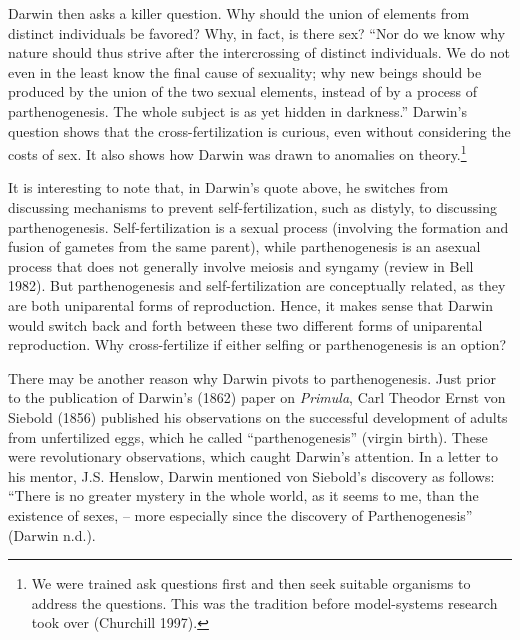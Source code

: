 \documentclass[
  letterpaper,
]{book}
\begin{document}
Darwin then asks a killer question. Why should the union of elements
from distinct individuals be favored? Why, in fact, is there sex? ``Nor
do we know why nature should thus strive after the intercrossing of
distinct individuals. We do not even in the least know the final cause
of sexuality; why new beings should be produced by the union of the two
sexual elements, instead of by a process of parthenogenesis. The whole
subject is as yet hidden in darkness.'' Darwin's question shows that the
cross-fertilization is curious, even without considering the costs of
sex. It also shows how Darwin was drawn to anomalies on
theory.\footnote{We were trained ask questions first and then seek
  suitable organisms to address the questions. This was the tradition
  before model-systems research took over (Churchill 1997).}

It is interesting to note that, in Darwin's quote above, he switches
from discussing mechanisms to prevent self-fertilization, such as
distyly, to discussing parthenogenesis. Self-fertilization is a sexual
process (involving the formation and fusion of gametes from the same
parent), while parthenogenesis is an asexual process that does not
generally involve meiosis and syngamy (review in Bell 1982). But
parthenogenesis and self-fertilization are conceptually related, as they
are both uniparental forms of reproduction. Hence, it makes sense that
Darwin would switch back and forth between these two different forms of
uniparental reproduction. Why cross-fertilize if either selfing or
parthenogenesis is an option?

There may be another reason why Darwin pivots to parthenogenesis. Just
prior to the publication of Darwin's (1862) paper on \emph{Primula},
Carl Theodor Ernst von Siebold (1856) published his observations on the
successful development of adults from unfertilized eggs, which he called
``parthenogenesis'' (virgin birth). These were revolutionary
observations, which caught Darwin's attention. In a letter to his
mentor, J.S. Henslow, Darwin mentioned von Siebold's discovery as
follows: ``There is no greater mystery in the whole world, as it seems
to me, than the existence of sexes, -- more especially since the
discovery of Parthenogenesis'' (Darwin n.d.).
\end{document}

